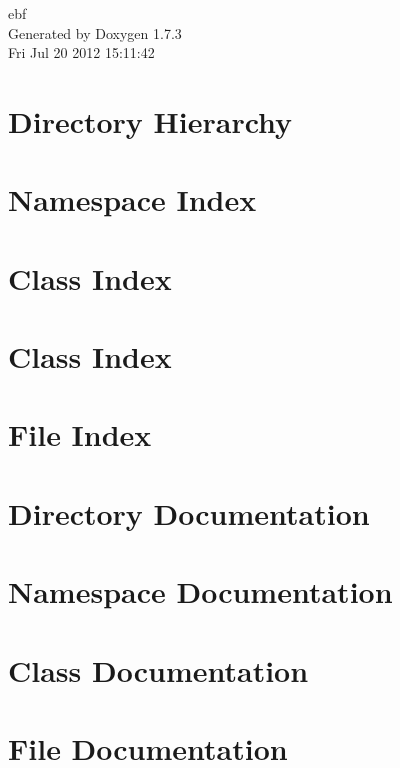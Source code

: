 \documentclass[letterpaper]{book}
\begin{document}
\hypersetup{pageanchor=false}
\begin{titlepage}
\vspace*{7cm}
\begin{center}
{\Large ebf }\\
\vspace*{1cm}
{\large Generated by Doxygen 1.7.3}\\
\vspace*{0.5cm}
{\small Fri Jul 20 2012 15:11:42}\\
\end{center}
\end{titlepage}
\clearemptydoublepage
{}
\tableofcontents
\clearemptydoublepage
{}
\hypersetup{pageanchor=true}
\chapter{Directory Hierarchy}

\chapter{Namespace Index}

\chapter{Class Index}

\chapter{Class Index}

\chapter{File Index}

\chapter{Directory Documentation}

\chapter{Namespace Documentation}











\chapter{Class Documentation}





\chapter{File Documentation}










\printindex
\end{document}
